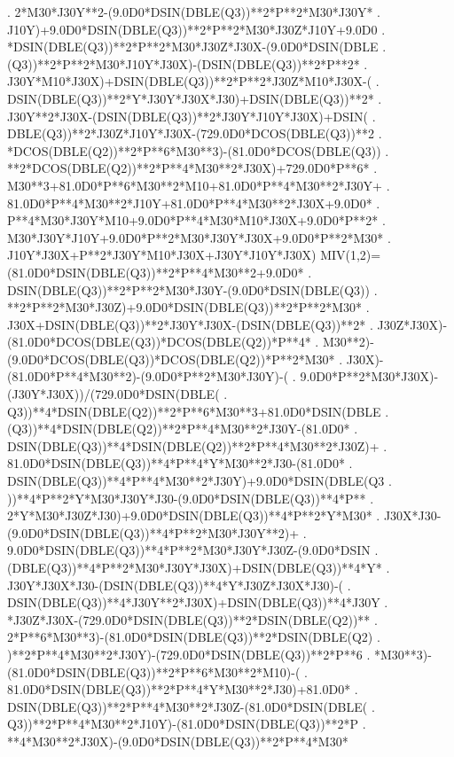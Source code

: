 \begin{framedverbatim}
     . 2*M30*J30Y**2-(9.0D0*DSIN(DBLE(Q3))**2*P**2*M30*J30Y*
     . J10Y)+9.0D0*DSIN(DBLE(Q3))**2*P**2*M30*J30Z*J10Y+9.0D0
     . *DSIN(DBLE(Q3))**2*P**2*M30*J30Z*J30X-(9.0D0*DSIN(DBLE
     . (Q3))**2*P**2*M30*J10Y*J30X)-(DSIN(DBLE(Q3))**2*P**2*
     . J30Y*M10*J30X)+DSIN(DBLE(Q3))**2*P**2*J30Z*M10*J30X-(
     . DSIN(DBLE(Q3))**2*Y*J30Y*J30X*J30)+DSIN(DBLE(Q3))**2*
     . J30Y**2*J30X-(DSIN(DBLE(Q3))**2*J30Y*J10Y*J30X)+DSIN(
     . DBLE(Q3))**2*J30Z*J10Y*J30X-(729.0D0*DCOS(DBLE(Q3))**2
     . *DCOS(DBLE(Q2))**2*P**6*M30**3)-(81.0D0*DCOS(DBLE(Q3))
     . **2*DCOS(DBLE(Q2))**2*P**4*M30**2*J30X)+729.0D0*P**6*
     . M30**3+81.0D0*P**6*M30**2*M10+81.0D0*P**4*M30**2*J30Y+
     . 81.0D0*P**4*M30**2*J10Y+81.0D0*P**4*M30**2*J30X+9.0D0*
     . P**4*M30*J30Y*M10+9.0D0*P**4*M30*M10*J30X+9.0D0*P**2*
     . M30*J30Y*J10Y+9.0D0*P**2*M30*J30Y*J30X+9.0D0*P**2*M30*
     . J10Y*J30X+P**2*J30Y*M10*J30X+J30Y*J10Y*J30X)
      MIV(1,2)=(81.0D0*DSIN(DBLE(Q3))**2*P**4*M30**2+9.0D0*
     . DSIN(DBLE(Q3))**2*P**2*M30*J30Y-(9.0D0*DSIN(DBLE(Q3))
     . **2*P**2*M30*J30Z)+9.0D0*DSIN(DBLE(Q3))**2*P**2*M30*
     . J30X+DSIN(DBLE(Q3))**2*J30Y*J30X-(DSIN(DBLE(Q3))**2*
     . J30Z*J30X)-(81.0D0*DCOS(DBLE(Q3))*DCOS(DBLE(Q2))*P**4*
     . M30**2)-(9.0D0*DCOS(DBLE(Q3))*DCOS(DBLE(Q2))*P**2*M30*
     . J30X)-(81.0D0*P**4*M30**2)-(9.0D0*P**2*M30*J30Y)-(
     . 9.0D0*P**2*M30*J30X)-(J30Y*J30X))/(729.0D0*DSIN(DBLE(
     . Q3))**4*DSIN(DBLE(Q2))**2*P**6*M30**3+81.0D0*DSIN(DBLE
     . (Q3))**4*DSIN(DBLE(Q2))**2*P**4*M30**2*J30Y-(81.0D0*
     . DSIN(DBLE(Q3))**4*DSIN(DBLE(Q2))**2*P**4*M30**2*J30Z)+
     . 81.0D0*DSIN(DBLE(Q3))**4*P**4*Y*M30**2*J30-(81.0D0*
     . DSIN(DBLE(Q3))**4*P**4*M30**2*J30Y)+9.0D0*DSIN(DBLE(Q3
     . ))**4*P**2*Y*M30*J30Y*J30-(9.0D0*DSIN(DBLE(Q3))**4*P**
     . 2*Y*M30*J30Z*J30)+9.0D0*DSIN(DBLE(Q3))**4*P**2*Y*M30*
     . J30X*J30-(9.0D0*DSIN(DBLE(Q3))**4*P**2*M30*J30Y**2)+
     . 9.0D0*DSIN(DBLE(Q3))**4*P**2*M30*J30Y*J30Z-(9.0D0*DSIN
     . (DBLE(Q3))**4*P**2*M30*J30Y*J30X)+DSIN(DBLE(Q3))**4*Y*
     . J30Y*J30X*J30-(DSIN(DBLE(Q3))**4*Y*J30Z*J30X*J30)-(
     . DSIN(DBLE(Q3))**4*J30Y**2*J30X)+DSIN(DBLE(Q3))**4*J30Y
     . *J30Z*J30X-(729.0D0*DSIN(DBLE(Q3))**2*DSIN(DBLE(Q2))**
     . 2*P**6*M30**3)-(81.0D0*DSIN(DBLE(Q3))**2*DSIN(DBLE(Q2)
     . )**2*P**4*M30**2*J30Y)-(729.0D0*DSIN(DBLE(Q3))**2*P**6
     . *M30**3)-(81.0D0*DSIN(DBLE(Q3))**2*P**6*M30**2*M10)-(
     . 81.0D0*DSIN(DBLE(Q3))**2*P**4*Y*M30**2*J30)+81.0D0*
     . DSIN(DBLE(Q3))**2*P**4*M30**2*J30Z-(81.0D0*DSIN(DBLE(
     . Q3))**2*P**4*M30**2*J10Y)-(81.0D0*DSIN(DBLE(Q3))**2*P
     . **4*M30**2*J30X)-(9.0D0*DSIN(DBLE(Q3))**2*P**4*M30*

\end{framedverbatim}
